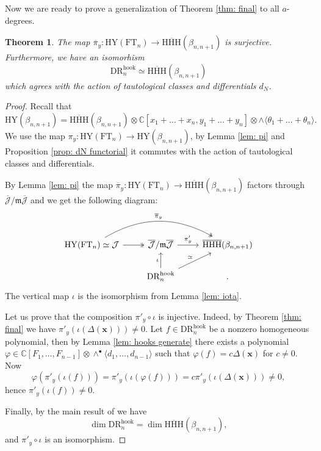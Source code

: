 \documentclass{amsart}
\newcommand{\C}{\mathbb{C}}
\newcommand{\xx}{\mathbf{x}}
\newcommand{\mm}{\mathfrak{m}}
\newcommand{\DR}{\mathrm{DR}}
\newcommand{\FT}{\mathrm{FT}}
\newcommand{\HY}{\mathrm{HY}}
\newcommand{\HHH}{\mathrm{HHH}}
\newcommand{\hook}{\mathrm{hook}}
\newcommand{\cJ}{\mathcal{J}}
\numberwithin{equation}{section}
\newtheorem{theorem}{Theorem}[section]
\theoremstyle{definition}
\begin{document}
Now we are ready to prove a generalization of Theorem \ref{thm: final} to all $a$-degrees.

\begin{theorem}
\label{thm: final full}
The map $\overline{\pi}_y:\HY(\FT_n)\to \overline{\HHH}(\beta_{n,n+1})$ is surjective. Furthermore, we have an isomorhism
$$
\DR_n^{\hook}\simeq \overline{\HHH}(\beta_{n,n+1})
$$
which agrees with the action of tautological classes and differentials $d_N$.
\end{theorem}

\begin{proof}
Recall that 
$$
\HY(\beta_{n,n+1})=\overline{\HHH}(\beta_{n,n+1})\otimes \C[x_1+\ldots+x_n,y_1+\ldots+y_n]\otimes \wedge\langle \theta_1+\ldots+\theta_n\rangle.
$$
We use the map $\pi_y:\HY(\FT_n)\to \HY(\beta_{n,n+1})$, by Lemma \ref{lem: pi} and Proposition \ref{prop: dN functorial} it commutes with the action of tautological classes and differentials.

By Lemma \ref{lem: pi} the map $\overline{\pi}_y:\HY(\FT_n)\to \overline{\HHH}(\beta_{n,n+1})$ factors through $\overline{\cJ}/\mm \overline{\cJ}$ and we get the following diagram:
$$
\begin{tikzcd}
\HY(\FT_n)\simeq \cJ \arrow[twoheadrightarrow]{r} \arrow[bend left,twoheadrightarrow]{rr}{\overline{\pi}_y}& \overline{\cJ}/\mm \overline{\cJ} \arrow{r}{\pi'_y}&  \overline{\HHH}(\beta_{n,n+1})\\
 & \DR_n^{\hook} \arrow{u}{\iota}  \arrow{ur}{\simeq} & .
\end{tikzcd}
$$
The vertical map $\iota$ is the isomorphism from Lemma \ref{lem: iota}. 

Let us prove that the composition $\pi'_y\circ \iota$ is injective. Indeed, by Theorem \ref{thm: final} we have $\pi'_y(\iota(\Delta(\xx)))\neq 0$. Let $f\in \DR_n^{\hook}$ be a nonzero homogeneous polynomial, then by Lemma \ref{lem: hooks generate} there exists a polynomial $\varphi\in \C[F_1,\ldots,F_{n-1}]\otimes \wedge^{\bullet}\langle d_1,\ldots,d_{n-1}\rangle$ such that $\varphi(f)=c\Delta(\xx)$ for $c\neq 0$. Now
$$
\varphi(\pi'_y(\iota(f)))=\pi'_y(\iota(\varphi(f)))=c\pi'_y(\iota(\Delta(\xx)))\neq 0,
$$
hence $\pi'_y(\iota(f))\neq 0$. 

Finally, by the main result of \cite{H} we have $$\dim \DR_n^{\hook}=\dim \overline{\HHH}(\beta_{n,n+1}),$$ and $\pi'_y\circ \iota$ is an isomorphism.
\end{proof}
\end{document}
